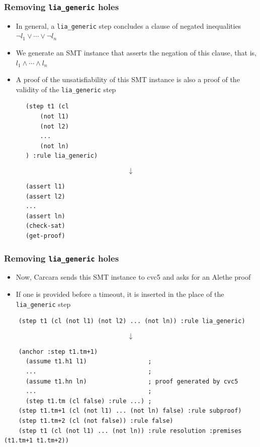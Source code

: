 \documentclass[usepdftitle=false,aspectratio=169]{beamer}
\newcommand\vitem{\vfill\item}
\begin{document}
\begin{frame}[fragile]
  \frametitle{Removing \texttt{lia\_generic} holes}
  \begin{minipage}[c][0.6 \textheight]{0.65 \textwidth}
    \begin{itemize}
      \item In general, a \texttt{lia\_generic} step concludes a clause of
      negated inequalities $\neg l_1 \lor \cdots \lor \neg l_n$
      \vitem We generate an SMT instance that asserts the negation of this
      clause, that is, $l_1 \land \cdots \land l_n$
      \vitem A proof of the unsatisfiability of this SMT instance is also a
      proof of the validity of the \texttt{lia\_generic} step
    \end{itemize}
  \end{minipage}
  \hfill
  \begin{minipage}[c]{0.3 \textwidth}
    \begin{verbatim}
      (step t1 (cl
          (not l1)
          (not l2)
          ...
          (not ln)
      ) :rule lia_generic)
    \end{verbatim}
    $$\downarrow$$
    \begin{verbatim}
      (assert l1)
      (assert l2)
      ...
      (assert ln)
      (check-sat)
      (get-proof)
    \end{verbatim}
  \end{minipage}
\end{frame}

\begin{frame}[fragile]
  \frametitle{Removing \texttt{lia\_generic} holes}
  \begin{itemize}
    \item Now, Carcara sends this SMT instance to cvc5 and asks for an Alethe
    proof
    \vitem If one is provided before a timeout, it is inserted in the place of
    the \texttt{lia\_generic} step
  \end{itemize}
  \vfill
  \begin{verbatim}
    (step t1 (cl (not l1) (not l2) ... (not ln)) :rule lia_generic)
  \end{verbatim}
  $$\downarrow$$
  \begin{verbatim}
    (anchor :step t1.tm+1)
      (assume t1.h1 l1)                 ;
      ...                               ;
      (assume t1.hn ln)                 ; proof generated by cvc5
      ...                               ;
      (step t1.tm (cl false) :rule ...) ;
    (step t1.tm+1 (cl (not l1) ... (not ln) false) :rule subproof)
    (step t1.tm+2 (cl (not false)) :rule false)
    (step t1 (cl (not l1) ... (not ln)) :rule resolution :premises (t1.tm+1 t1.tm+2))
  \end{verbatim}
\end{frame}
\end{document}
